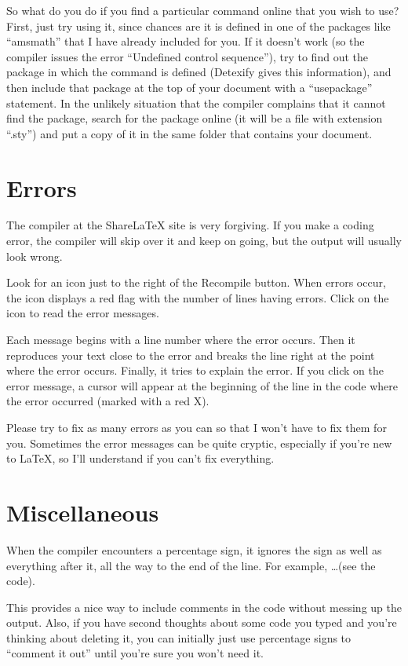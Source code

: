 \documentclass{article}
\begin{document}
So what do you do if you find a particular command online that you wish to use?  First, just try using it, since chances are it is
defined in one of the packages like ``amsmath'' that I have already included for you.  If it doesn't work (so the compiler issues
the error ``Undefined control sequence''), try to find out the package in which the command is defined (Detexify gives this information),
and then include that package at the top of your document with a ``usepackage'' statement.  In the unlikely situation that the
compiler complains that it cannot find the package, search for the package online (it will be a file with extension ``.sty'') and
put a copy of it in the same folder that contains your document.

\section{Errors}

The compiler at the ShareLaTeX site is very forgiving.  If you make a coding error, the compiler will skip over it and keep on
going, but the output will usually look wrong.

Look for an icon just to the right of the Recompile button.  When errors occur, the icon displays a red flag with the number of
lines having errors.  Click on the icon to read the error messages.

Each message begins with a line number where the error occurs.  Then it reproduces your text close to the error and breaks the line
right at the point where the error occurs.  Finally, it tries to explain the error.  If you click on the error message, a cursor
will appear at the beginning of the line in the code where the error occurred (marked with a red X).

Please try to fix as many errors as you can so that I won't have to fix them for you.  Sometimes the error messages can be quite
cryptic, especially if you're new to \LaTeX, so I'll understand if you can't fix everything.

\section{Miscellaneous}

When the compiler encounters a percentage sign, it ignores the sign as well as everything after it, all the way to the end of the
line. For example, \dots (see the code). %

%
This provides a nice way to include comments in the code without messing up the output.  Also, if you have second thoughts about
some code you typed and you're thinking about deleting it, you can initially just use percentage signs to ``comment it out'' until
you're sure you won't need it.
\end{document}
